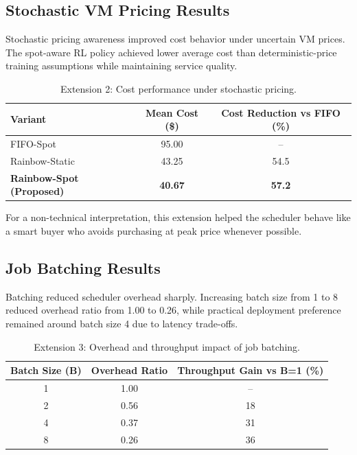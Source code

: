 \subsection{Stochastic VM Pricing Results}
Stochastic pricing awareness improved cost behavior under uncertain VM prices. The spot-aware RL policy achieved lower average cost than deterministic-price training assumptions while maintaining service quality.

\renewcommand{\arraystretch}{1.15}
\begin{table}[H]
\centering
\caption{Extension 2: Cost performance under stochastic pricing.}
\label{tab:ext2_results}
\begin{tabular}{|l|c|c|}
\hline
\textbf{Variant} & \textbf{Mean Cost (\$)} & \textbf{Cost Reduction vs FIFO (\%)} \\
\hline
FIFO-Spot & 95.00 & -- \\
\hline
Rainbow-Static & 43.25 & 54.5 \\
\hline
\textbf{Rainbow-Spot (Proposed)} & \textbf{40.67} & \textbf{57.2} \\
\hline
\end{tabular}
\end{table}

For a non-technical interpretation, this extension helped the scheduler behave like a smart buyer who avoids purchasing at peak price whenever possible.

\subsection{Job Batching Results}
Batching reduced scheduler overhead sharply. Increasing batch size from 1 to 8 reduced overhead ratio from 1.00 to 0.26, while practical deployment preference remained around batch size 4 due to latency trade-offs.

\renewcommand{\arraystretch}{1.15}
\begin{table}[H]
\centering
\caption{Extension 3: Overhead and throughput impact of job batching.}
\label{tab:ext3_results}
\begin{tabular}{|c|c|c|}
\hline
\textbf{Batch Size (B)} & \textbf{Overhead Ratio} & \textbf{Throughput Gain vs B=1 (\%)} \\
\hline
1 & 1.00 & -- \\
\hline
2 & 0.56 & 18 \\
\hline
4 & 0.37 & 31 \\
\hline
8 & 0.26 & 36 \\
\hline
\end{tabular}
\end{table}

